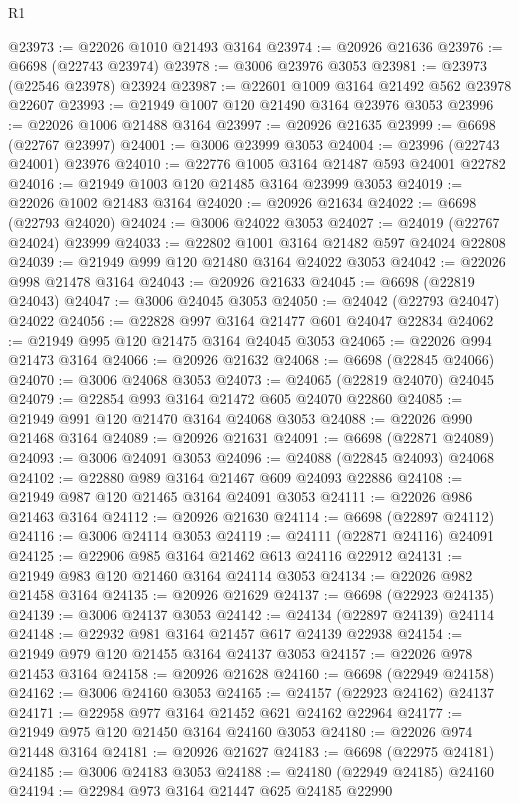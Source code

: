 \begin{lexlean}{R1}
\begin{coremodule}
@23973 := @22026 @1010 @21493 @3164
@23974 := @20926 @21636
@23976 := @6698 (@22743 @23974)
@23978 := @3006 @23976 @3053
@23981 := @23973 (@22546 @23978) @23924
@23987 := @22601 @1009 @3164 @21492 @562 @23978 @22607
@23993 := @21949 @1007 @120 @21490 @3164 @23976 @3053
@23996 := @22026 @1006 @21488 @3164
@23997 := @20926 @21635
@23999 := @6698 (@22767 @23997)
@24001 := @3006 @23999 @3053
@24004 := @23996 (@22743 @24001) @23976
@24010 := @22776 @1005 @3164 @21487 @593 @24001 @22782
@24016 := @21949 @1003 @120 @21485 @3164 @23999 @3053
@24019 := @22026 @1002 @21483 @3164
@24020 := @20926 @21634
@24022 := @6698 (@22793 @24020)
@24024 := @3006 @24022 @3053
@24027 := @24019 (@22767 @24024) @23999
@24033 := @22802 @1001 @3164 @21482 @597 @24024 @22808
@24039 := @21949 @999 @120 @21480 @3164 @24022 @3053
@24042 := @22026 @998 @21478 @3164
@24043 := @20926 @21633
@24045 := @6698 (@22819 @24043)
@24047 := @3006 @24045 @3053
@24050 := @24042 (@22793 @24047) @24022
@24056 := @22828 @997 @3164 @21477 @601 @24047 @22834
@24062 := @21949 @995 @120 @21475 @3164 @24045 @3053
@24065 := @22026 @994 @21473 @3164
@24066 := @20926 @21632
@24068 := @6698 (@22845 @24066)
@24070 := @3006 @24068 @3053
@24073 := @24065 (@22819 @24070) @24045
@24079 := @22854 @993 @3164 @21472 @605 @24070 @22860
@24085 := @21949 @991 @120 @21470 @3164 @24068 @3053
@24088 := @22026 @990 @21468 @3164
@24089 := @20926 @21631
@24091 := @6698 (@22871 @24089)
@24093 := @3006 @24091 @3053
@24096 := @24088 (@22845 @24093) @24068
@24102 := @22880 @989 @3164 @21467 @609 @24093 @22886
@24108 := @21949 @987 @120 @21465 @3164 @24091 @3053
@24111 := @22026 @986 @21463 @3164
@24112 := @20926 @21630
@24114 := @6698 (@22897 @24112)
@24116 := @3006 @24114 @3053
@24119 := @24111 (@22871 @24116) @24091
@24125 := @22906 @985 @3164 @21462 @613 @24116 @22912
@24131 := @21949 @983 @120 @21460 @3164 @24114 @3053
@24134 := @22026 @982 @21458 @3164
@24135 := @20926 @21629
@24137 := @6698 (@22923 @24135)
@24139 := @3006 @24137 @3053
@24142 := @24134 (@22897 @24139) @24114
@24148 := @22932 @981 @3164 @21457 @617 @24139 @22938
@24154 := @21949 @979 @120 @21455 @3164 @24137 @3053
@24157 := @22026 @978 @21453 @3164
@24158 := @20926 @21628
@24160 := @6698 (@22949 @24158)
@24162 := @3006 @24160 @3053
@24165 := @24157 (@22923 @24162) @24137
@24171 := @22958 @977 @3164 @21452 @621 @24162 @22964
@24177 := @21949 @975 @120 @21450 @3164 @24160 @3053
@24180 := @22026 @974 @21448 @3164
@24181 := @20926 @21627
@24183 := @6698 (@22975 @24181)
@24185 := @3006 @24183 @3053
@24188 := @24180 (@22949 @24185) @24160
@24194 := @22984 @973 @3164 @21447 @625 @24185 @22990

\end{coremodule}
\end{lexlean}
